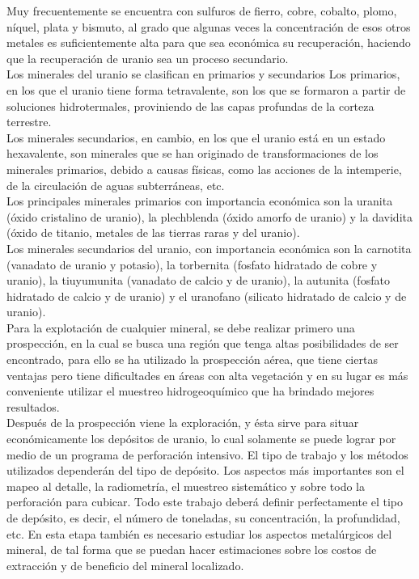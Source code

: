 \documentclass[]{article}
\begin{document}
Muy frecuentemente se encuentra con sulfuros de fierro, cobre, cobalto, plomo, níquel, plata y bismuto, al grado que algunas veces la concentración  de esos otros metales es suficientemente alta para que sea económica su recuperación, haciendo que la recuperación de uranio sea un proceso secundario.\\

 Los minerales del uranio se clasifican en primarios y secundarios Los primarios, en los que el uranio tiene forma tetravalente, son los que se formaron a partir de soluciones hidrotermales, proviniendo de las capas profundas de la corteza terrestre.\\

Los minerales secundarios, en cambio, en los que el uranio está en un estado hexavalente, son minerales que se han originado de transformaciones de los minerales primarios, debido a causas físicas, como las acciones de la intemperie, de la circulación de aguas subterráneas, etc.\\

Los principales minerales primarios con importancia económica son la uranita (óxido cristalino de uranio), la plechblenda (óxido amorfo de uranio) y la davidita (óxido de titanio, metales de las tierras raras y del uranio).\\

 Los minerales secundarios del uranio, con importancia económica son la carnotita (vanadato de uranio y potasio), la torbernita (fosfato hidratado de cobre y uranio), la tiuyumunita (vanadato de calcio y de uranio), la autunita (fosfato hidratado de calcio y de uranio) y el uranofano (silicato hidratado de calcio y de uranio).\\
 
Para la explotación de cualquier mineral, se debe realizar primero una prospección, en la cual se busca una región que tenga altas posibilidades de ser encontrado, para ello se ha utilizado la prospección aérea, que tiene ciertas ventajas pero tiene dificultades en áreas con alta vegetación y en su lugar es más conveniente utilizar el muestreo hidrogeoquímico que ha brindado mejores resultados.\\

Después de la prospección viene la exploración, y ésta sirve para situar económicamente los depósitos de uranio, lo cual solamente se puede lograr por medio de un programa de perforación intensivo. El tipo de trabajo y los métodos utilizados dependerán del tipo de depósito. Los aspectos más importantes son el mapeo al detalle, la radiometría, el muestreo sistemático y sobre todo la perforación para cubicar. Todo este trabajo deberá definir perfectamente el tipo de depósito, es decir, el número de toneladas, su concentración, la profundidad, etc. En esta etapa también es necesario estudiar los aspectos metalúrgicos del mineral, de tal forma que se puedan hacer estimaciones sobre los costos de extracción y de beneficio del mineral localizado.\\
\end{document}
